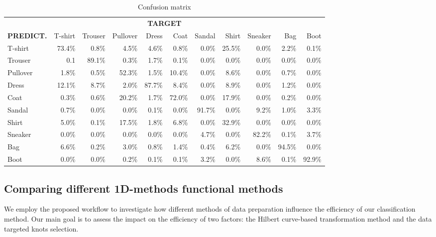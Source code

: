 \begin{enumerate}[leftmargin=0.2cm]
\begin{table}[h]
\centering
\caption{Confusion matrix}
\small
 \begin{tabular}{l r r r r r r r r r r}
 \toprule 
 \multicolumn{11}{c}{\bf TARGET}\\
 \bf PREDICT. &T-shirt & Trouser & Pullover & Dress & Coat & Sandal & Shirt & Sneaker &Bag &Boot\\
 \midrule
T-shirt& 73.4\% &0.8\% &4.5\% &4.6\% &0.8\% &0.0\% & 25.5\% &0.0\% &2.2\% & 0.1\%\\
Trouser& 0.1 & 89.1\% &0.3\% &1.7\% &0.1\% &0.0\% &0.0\% &0.0\% &0.0\% & 0.0\%\\
Pullover& 1.8\% &0.5\% & 52.3\% &1.5\% & 10.4\% &0.0\% &8.6\% &0.0\% &0.7\% & 0.0\%\\
Dress & 12.1\% &8.7\% &2.0\% & 87.7\% &8.4\% &0.0\% &8.9\% &0.0\% &1.2\% & 0.0\% \\
Coat & 0.3\% &0.6\% & 20.2\% &1.7\% & 72.0\% &0.0\% & 17.9\% &0.0\% &0.2\% & 0.0\%\\
Sandal & 0.7\% &0.0\% &0.0\% &0.1\% &0.0\% & 91.7\% &0.0\% &9.2\% &1.0\% & 3.3\%\\
Shirt & 5.0\% &0.1\% & 17.5\% &1.8\% &6.8\% &0.0\% & 32.9\% &0.0\% &0.0\% & 0.0\%\\
Sneaker & 0.0\% &0.0\% &0.0\% &0.0\% &0.0\% &4.7\% &0.0\% & 82.2\% &0.1\% & 3.7\% \\
Bag & 6.6\% &0.2\% &3.0\% &0.8\% &1.4\% &0.4\% &6.2\% &0.0\% & 94.5\% & 0.0\% \\
Boot & 0.0\% &0.0\% &0.2\% &0.1\% &0.1\% &3.2\% &0.0\% &8.6\% &0.1\% &92.9\%\\
\bottomrule
\end{tabular}
\label{tab:confusion}
\end{table}


\end{enumerate}

\vspace{-.13cm}
\subsection{Comparing different 1D-methods functional methods}\vspace{-.22cm}
We employ the proposed workflow to investigate how different methods of data preparation influence the efficiency of our classification method.
Our main goal is to assess the impact on the efficiency of two factors: the Hilbert curve-based transformation method and the data targeted knots selection.

